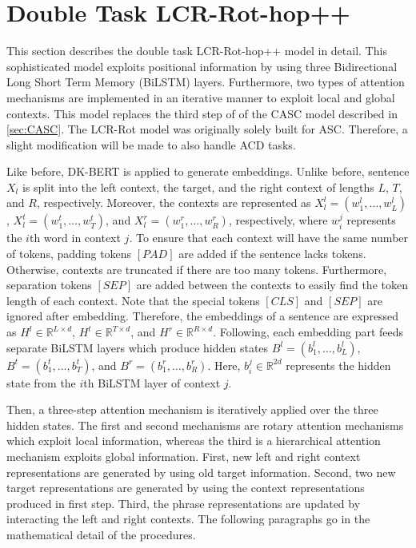 \documentclass[american, oneside]{ecsgdp}
\begin{document}
\section{Double Task LCR-Rot-hop++} \label{sec:LCR-Rot}
This section describes the double task LCR-Rot-hop++ model \parencite{Trusca2020HAABSA++} in detail. This sophisticated model exploits positional information by using three Bidirectional Long Short Term Memory (BiLSTM) layers. Furthermore, two types of attention mechanisms are implemented in an iterative manner to exploit local and global contexts. This model replaces the third step of of the CASC model described in \cref{sec:CASC}. The LCR-Rot model was originally solely built for ASC. Therefore, a slight modification will be made to also handle ACD tasks.

Like before, DK-BERT is applied to generate embeddings. Unlike before, sentence $X_l$ is split into the left context, the target, and the right context of lengths $L$, $T$, and $R$, respectively. Moreover, the contexts are represented as $X_l^l = \left ( w_1^l, \ldots, w_L^l \right )$, $X_l^t = \left ( w_1^t, \ldots, w_T^t \right )$, and $X_l^r = \left ( w_1^r, \ldots, w_R^r \right )$, respectively, where $w_i^j$ represents the $i$th word in context $j$. To ensure that each context will have the same number of tokens, padding tokens $[PAD]$ are added if the sentence lacks tokens. Otherwise, contexts are truncated if there are too many tokens. Furthermore, separation tokens $[SEP]$ are added between the contexts to easily find the token length of each context. Note that the special tokens $[CLS]$ and $[SEP]$ are ignored after embedding. Therefore, the embeddings of a sentence are expressed as $H^l \in \mathbb{R}^{L \times d}$, $H^t \in \mathbb{R}^{T \times d}$, and $H^r \in \mathbb{R}^{R \times d}$. Following, each embedding part feeds separate BiLSTM layers which produce hidden states $B^l = \left( b_1^l, \dots, b_L^l \right)$, $B^t = \left( b_1^t, \dots, b_T^t \right)$, and $B^r = \left( b_1^r, \dots, b_R^r \right)$. Here, $b_i^j \in \mathbb{R}^{2d}$ represents the hidden state from the $i$th BiLSTM layer of context $j$.

Then, a three-step attention mechanism is iteratively applied over the three hidden states. The first and second mechanisms are rotary attention mechanisms which exploit local information, whereas the third is a hierarchical attention mechanism exploits global information. First, new left and right context representations are generated by using old target information. Second, two new target representations are generated by using the context representations produced in first step. Third, the phrase representations are updated by interacting the left and right contexts. The following paragraphs go in the mathematical detail of the procedures.
\end{document}

